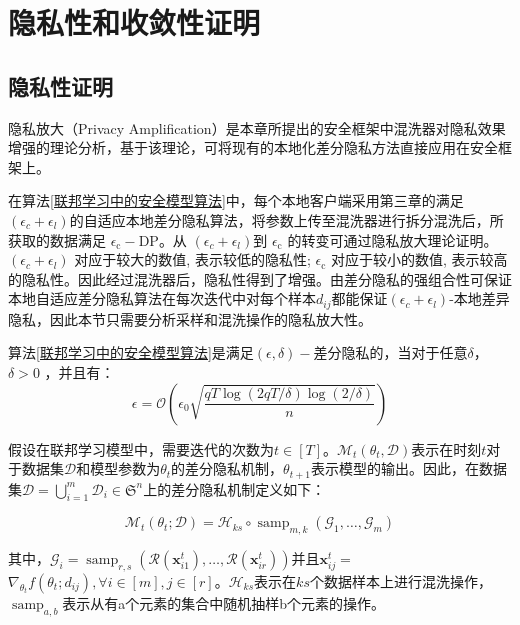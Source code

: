 \section{隐私性和收敛性证明}
\subsection{隐私性证明}
隐私放大（Privacy Amplification）是本章所提出的安全框架中混洗器对隐私效果增强的理论分析，基于该理论，可将现有的本地化差分隐私方法直接应用在安全框架上。

在算法\ref{联邦学习中的安全模型算法}中，每个本地客户端采用第三章的满足$\left(\epsilon_{c}+\epsilon_{l}\right)$的自适应本地差分隐私算法，将参数上传至混洗器进行拆分混洗后，所获取的数据满足 $\epsilon_{\mathrm{c}}-\mathrm{DP}$。从 $\left(\epsilon_{c}+\epsilon_{l}\right)$到 $\epsilon_{\mathrm{c}}$ 的转变可通过隐私放大理论证明。$\left(\epsilon_{c}+\epsilon_{l}\right)$ 对应于较大的数值, 表示较低的隐私性; $\epsilon_{\mathrm{c}}$ 对应于较小的数值, 表示较高的隐私性。因此经过混洗器后，隐私性得到了增强。由差分隐私的强组合性可保证本地自适应差分隐私算法在每次迭代中对每个样本$d_{i j}$都能保证$\left(\epsilon_{c}+\epsilon_{l}\right)$-本地差异隐私，因此本节只需要分析采样和混洗操作的隐私放大性。

\begin{theorem}\label{隐私性证明}
算法\ref{联邦学习中的安全模型算法}是满足$(\epsilon, \delta)-$差分隐私的，当对于任意$\delta$，$\delta>0$ ，并且有：
$$
\epsilon=\mathcal{O}\left(\epsilon_{0} \sqrt{\frac{q T \log (2 q T / \delta) \log (2 / \delta)}{n}}\right)
$$
\end{theorem}

假设在联邦学习模型中，需要迭代的次数为$t \in[T]$。$\mathcal{M}_{t}\left(\theta_{t}, \mathcal{D}\right)$表示在时刻$t$对于数据集$\mathcal{D}$和模型参数为$\theta_{t}$的差分隐私机制，$\theta_{t+1}$表示模型的输出。因此，在数据集$\mathcal{D}=\bigcup_{i=1}^{m} \mathcal{D}_{i} \in \mathfrak{S}^{n}$上的差分隐私机制定义如下：

\begin{equation}\label{eq:隐私性证明机制}
\mathcal{M}_{t}\left(\theta_{t} ; \mathcal{D}\right)=\mathcal{H}_{k s} \circ \operatorname{samp}_{m, k}\left(\mathcal{G}_{1}, \ldots, \mathcal{G}_{m}\right)
\end{equation}

其中，$\mathcal{G}_{i}=\operatorname{samp}_{r, s}\left(\mathcal{R}\left(\boldsymbol{x}_{i 1}^{t}\right), \ldots, \mathcal{R}\left(\boldsymbol{x}_{i r}^{t}\right)\right)$并且$\boldsymbol{x}_{i j}^{t}=$$\nabla_{\theta_{t}} f\left(\theta_{t} ; d_{i j}\right), \forall i \in[m], j \in[r]$。$\mathcal{H}_{k s}$表示在$k s$个数据样本上进行混洗操作， $\operatorname{samp}_{a, b}$表示从有a个元素的集合中随机抽样b个元素的操作。


